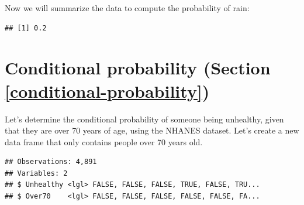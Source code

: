 \documentclass[12pt,]{book}
\newenvironment{Shaded}{\begin{snugshade}}{\end{snugshade}}
\newcommand{\DataTypeTok}[1]{\textcolor[rgb]{0.13,0.29,0.53}{#1}}
\newcommand{\DecValTok}[1]{\textcolor[rgb]{0.00,0.00,0.81}{#1}}
\newcommand{\KeywordTok}[1]{\textcolor[rgb]{0.13,0.29,0.53}{\textbf{#1}}}
\newcommand{\NormalTok}[1]{#1}
\newcommand{\OperatorTok}[1]{\textcolor[rgb]{0.81,0.36,0.00}{\textbf{#1}}}
\newcommand{\StringTok}[1]{\textcolor[rgb]{0.31,0.60,0.02}{#1}}
\begin{document}
Now we will summarize the data to compute the probability of rain:

\begin{Shaded}
\end{Shaded}

\begin{verbatim}
## [1] 0.2
\end{verbatim}

\hypertarget{conditional-probability-section-refconditional-probability}{%
\section{Conditional probability (Section \ref{conditional-probability})}\label{conditional-probability-section-refconditional-probability}}

Let's determine the conditional probability of someone being unhealthy, given that they are over 70 years of age, using the NHANES dataset. Let's create a new data frame that only contains people over 70 years old.

\begin{Shaded}
\end{Shaded}

\begin{verbatim}
## Observations: 4,891
## Variables: 2
## $ Unhealthy <lgl> FALSE, FALSE, FALSE, TRUE, FALSE, TRU...
## $ Over70    <lgl> FALSE, FALSE, FALSE, FALSE, FALSE, FA...
\end{verbatim}
\end{document}
